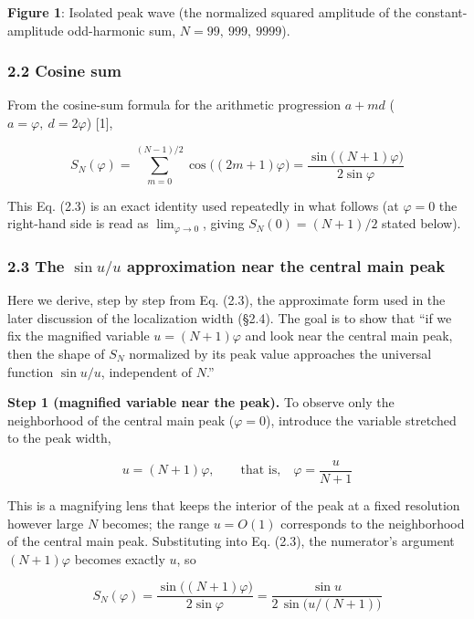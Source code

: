 \documentclass[
]{ltjsarticle}
\begin{document}
\textbf{Figure 1}: Isolated peak wave (the normalized squared amplitude
of the constant-amplitude odd-harmonic sum, \(N=99,\ 999,\ 9999\)).

\subsubsection{2.2 Cosine sum}\label{cosine-sum}

From the cosine-sum formula for the arithmetic progression \(a+md\)
(\(a=\varphi,\ d=2\varphi\)) {[}1{]},

\[
S_N(\varphi)=\sum_{m=0}^{(N-1)/2}\cos\!\big((2m+1)\varphi\big)
=\frac{\sin\!\big((N+1)\varphi\big)}{2\sin\varphi}
\tag{2.3}
\]

This Eq. (2.3) is an exact identity used repeatedly in what follows (at
\(\varphi=0\) the right-hand side is read as \(\lim_{\varphi\to0}\),
giving \(S_N(0)=(N+1)/2\) stated below).

\subsubsection{\texorpdfstring{2.3 The \(\sin u/u\) approximation near
the central main
peak}{2.3 The \textbackslash sin u/u approximation near the central main peak}}\label{the-sin-uu-approximation-near-the-central-main-peak}

Here we derive, step by step from Eq. (2.3), the approximate form used
in the later discussion of the localization width (§2.4). The goal is to
show that ``if we fix the magnified variable \(u=(N+1)\varphi\) and look
near the central main peak, then the shape of \(S_N\) normalized by its
peak value approaches the universal function \(\sin u/u\), independent
of \(N\).''

\textbf{Step 1 (magnified variable near the peak).} To observe only the
neighborhood of the central main peak (\(\varphi=0\)), introduce the
variable stretched to the peak width,

\[
u=(N+1)\varphi,\qquad\text{that is,}\quad \varphi=\frac{u}{N+1}
\tag{2.4}
\]

This is a magnifying lens that keeps the interior of the peak at a fixed
resolution however large \(N\) becomes; the range \(u=O(1)\) corresponds
to the neighborhood of the central main peak. Substituting into Eq.
(2.3), the numerator's argument \((N+1)\varphi\) becomes exactly \(u\),
so

\[
S_N(\varphi)=\frac{\sin\!\big((N+1)\varphi\big)}{2\sin\varphi}
=\frac{\sin u}{2\,\sin\!\big(u/(N+1)\big)}
\tag{2.5}
\]
\end{document}
